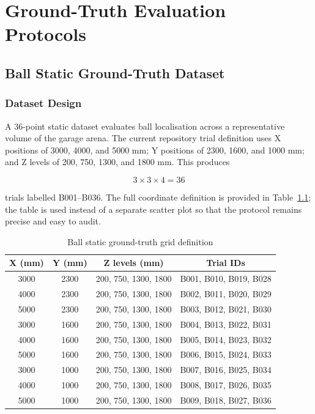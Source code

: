 \chapter{Ground-Truth Evaluation Protocols}

\section{Ball Static Ground-Truth Dataset}

\subsection{Dataset Design}

A 36-point static dataset evaluates ball localisation across a representative volume of the garage arena. The current repository trial definition uses X positions of 3000, 4000, and 5000 mm; Y positions of 2300, 1600, and 1000 mm; and Z levels of 200, 750, 1300, and 1800 mm. This produces

\[
3 \times 3 \times 4 = 36
\]

trials labelled B001--B036. The full coordinate definition is provided in Table~\ref{table:4_1_ball_static_grid}; the table is used instead of a separate scatter plot so that the protocol remains precise and easy to audit.

\begin{table}[h]
\centering
\caption{Ball static ground-truth grid definition}
\label{table:4_1_ball_static_grid}
\begin{tabular}{|c|c|c|c|}
\hline
\textbf{X (mm)} & \textbf{Y (mm)} & \textbf{Z levels (mm)} & \textbf{Trial IDs} \\
\hline
3000 & 2300 & 200, 750, 1300, 1800 & B001, B010, B019, B028 \\
\hline
4000 & 2300 & 200, 750, 1300, 1800 & B002, B011, B020, B029 \\
\hline
5000 & 2300 & 200, 750, 1300, 1800 & B003, B012, B021, B030 \\
\hline
3000 & 1600 & 200, 750, 1300, 1800 & B004, B013, B022, B031 \\
\hline
4000 & 1600 & 200, 750, 1300, 1800 & B005, B014, B023, B032 \\
\hline
5000 & 1600 & 200, 750, 1300, 1800 & B006, B015, B024, B033 \\
\hline
3000 & 1000 & 200, 750, 1300, 1800 & B007, B016, B025, B034 \\
\hline
4000 & 1000 & 200, 750, 1300, 1800 & B008, B017, B026, B035 \\
\hline
5000 & 1000 & 200, 750, 1300, 1800 & B009, B018, B027, B036 \\
\hline
\end{tabular}
\end{table}

